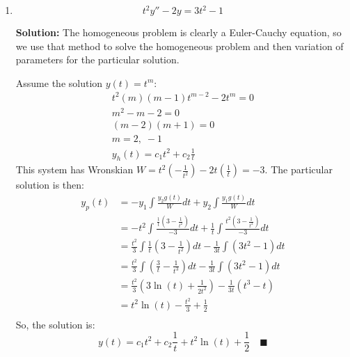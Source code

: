 \documentclass[letterpaper, fontsize=10pt]{scrartcl} %
\numberwithin{equation}{section} %
\numberwithin{figure}{section} %
\numberwithin{table}{section} %
\begin{document}
\begin{enumerate}
\begin{enumerate}[label=(\alph*)]
\item 
\[ t^2y'' -2y=3t^2 -1 \]
\par \textbf{Solution:} The homogeneous problem is clearly a Euler-Cauchy equation, so we use that method to solve the homogeneous problem and then variation of parameters for the particular solution. 
\par Assume the solution $y(t) = t^m$:
\begin{gather*}
t^2(m)(m-1)t^{m-2} -2t^m = 0\\
m^2 - m - 2 = 0\\
(m-2)(m+1) = 0\\
m = 2,\; -1\\
y_h(t) = c_1 t^2 + c_2\frac{1}{t}
\end{gather*}
This system has Wronskian $W = t^2\left( -\frac{1}{t^2} \right) - 2t\left(\frac{1}{t} \right) = -3$. The particular solution is then:
\begin{align*}
y_p(t) &= -y_1 \int \frac{y_2 g(t)}{W}dt + y_2 \int \frac{y_1 g(t)}{W}dt \\
&= -t^2 \int \frac{\frac{1}{t} \left( 3 - \frac{1}{t^2}\right)}{-3}dt + \frac{1}{t} \int \frac{t^2 \left( 3 - \frac{1}{t^2}\right)}{-3}dt \\
&= \frac{t^2}{3} \int \frac{1}{t} \left( 3 - \frac{1}{t^2}\right)dt - \frac{1}{3t} \int \left(3t^2 - 1 \right)dt \\
&= \frac{t^2}{3} \int \left( \frac{3}{t} - \frac{1}{t^3}\right)dt - \frac{1}{3t} \int \left(3t^2 - 1 \right)dt \\
&= \frac{t^2}{3} \left( 3\ln(t) + \frac{1}{2t^2} \right) - \frac{1}{3t} \left(t^3 - t \right) \\
&= t^2 \ln(t) -\frac{t^2}{3} + \frac{1}{2} \\
\end{align*}
So, the solution is:
\[ y(t) = c_1 t^2 + c_2\frac{1}{t} + t^2 \ln(t) + \frac{1}{2} \quad\blacksquare\]


\end{enumerate}
\end{enumerate}
\end{document}
